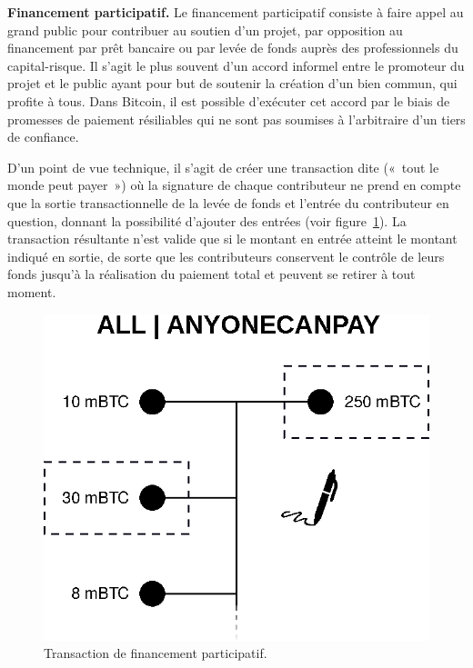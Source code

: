 
\textbf{Financement participatif.} Le financement participatif consiste à faire appel au grand public pour contribuer au soutien d'un projet, par opposition au financement par prêt bancaire ou par levée de fonds auprès des professionnels du capital-risque. Il s'agit le plus souvent d'un accord informel entre le promoteur du projet et le public ayant pour but de soutenir la création d'un bien commun, qui profite à tous. Dans Bitcoin, il est possible d'exécuter cet accord par le biais de promesses de paiement résiliables qui ne sont pas soumises à l'arbitraire d'un tiers de confiance.

D'un point de vue technique, il s'agit de créer une transaction dite  («~tout le monde peut payer~») où la signature de chaque contributeur ne prend en compte que la sortie transactionnelle de la levée de fonds et l'entrée du contributeur en question, donnant la possibilité d'ajouter des entrées (voir figure~\ref{fig:sighash-anyonecanpay}). La transaction résultante n'est valide que si le montant en entrée atteint le montant indiqué en sortie, de sorte que les contributeurs conservent le contrôle de leurs fonds jusqu'à la réalisation du paiement total et peuvent se retirer à tout moment.

\begin{figure}[ht]
  \centering
  \includegraphics[scale=0.65]{img/sighash-anyonecanpay.eps}
  \caption{Transaction de financement participatif.}
  \label{fig:sighash-anyonecanpay}
\end{figure}

